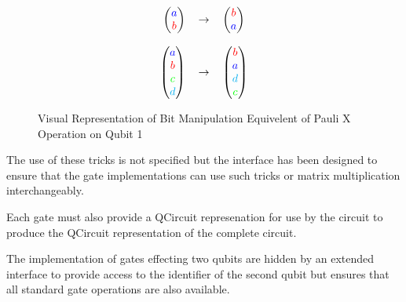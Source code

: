 \begin{figure}
\[
\begin{tabular}{ r c l }
  \(\begin {pmatrix}
    \textcolor{blue}{a}\\
    \textcolor{red}{b}
  \end{pmatrix}\) 
& 
  \(\rightarrow\) 
& 
  \(\begin {pmatrix}
    \textcolor{red}{b}\\
    \textcolor{blue}{a}
  \end{pmatrix}\) \\

\\

  \(\begin {pmatrix}
    \textcolor{blue}{a}\\
    \textcolor{red}{b}\\
    \textcolor{green}{c}\\
    \textcolor{cyan}{d}
  \end{pmatrix}\)
  & \(\rightarrow\)
  & \(\begin {pmatrix}
    \textcolor{red}{b}\\
    \textcolor{blue}{a}\\
    \textcolor{cyan}{d}\\
    \textcolor{green}{c}
  \end{pmatrix}\) \\
\end{tabular}
\]
\label{eq:paulixcheaptrickvisual}
\caption{Visual Representation of Bit Manipulation Equivelent of Pauli X Operation on Qubit 1}
\end{figure}

The use of these tricks is not specified but the interface has been designed to ensure that the gate implementations can use such tricks or matrix multiplication interchangeably.

Each gate must also provide a QCircuit represenation for use by the circuit to produce the QCircuit representation of the complete circuit.

The implementation of gates effecting two qubits are hidden by an extended interface to provide access to the identifier of the second qubit but ensures that all standard gate operations are also available.

% 
% 

